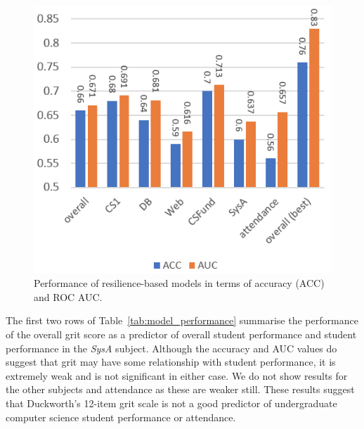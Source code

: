 \documentclass[sigconf]{acmart}
\begin{document}
\begin{figure} [h]
\centering
\includegraphics[width=.9\linewidth]{images/model_performance.png}
\caption{Performance of resilience-based models in terms of accuracy (ACC) and ROC AUC.}
\label{fig:model_performance} 
\end{figure}

The first two rows of Table~\ref{tab:model_performance} summarise the performance of the overall grit score as a predictor of overall student performance and student performance in the {\em SysA} subject. Although the accuracy and AUC values do suggest that grit may have some relationship with student performance, it is extremely weak and is not significant in either case. We do not show results for the other subjects and attendance as these are weaker still. These results suggest that Duckworth's 12-item grit scale is not a good predictor of undergraduate computer science student performance or attendance. 
\end{document}
